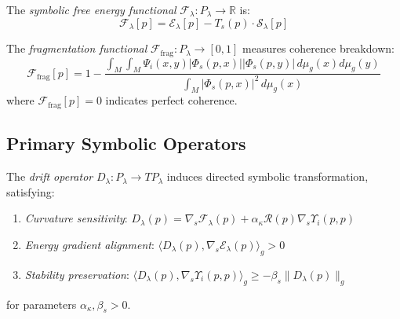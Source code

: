 \begin{definition}
\label{definition:bk6_symbolic_free_energy_functional}
The \emph{symbolic free energy functional} $\mathcal{F}_\lambda : P_\lambda \to \mathbb{R}$ is:
\begin{equation}
\mathcal{F}_\lambda[p] = \mathcal{E}_\lambda[p] - T_s(p) \cdot \mathcal{S}_\lambda[p]
\end{equation}
\end{definition}

\begin{definition}
\label{definition:bk6_fragmentation_functional}
The \emph{fragmentation functional} $\mathcal{F}_{\text{frag}} : P_\lambda \to [0,1]$ measures coherence breakdown:
\begin{equation}
\mathcal{F}_{\text{frag}}[p] = 1 - \frac{\int_M \int_M \Psi_i(x,y)|\Phi_s(p,x)||\Phi_s(p,y)| \, d\mu_g(x) d\mu_g(y)}{\int_M |\Phi_s(p,x)|^2 \, d\mu_g(x)}
\end{equation}
where $\mathcal{F}_{\text{frag}}[p] = 0$ indicates perfect coherence.
\end{definition}

\subsection{Primary Symbolic Operators}
\label{subsection:bk6_primary_symbolic_operators_complete}

\begin{definition}
\label{definition:bk6_drift_operator_complete}
The \emph{drift operator} $D_\lambda : P_{\lambda} \to T P_{\lambda}$ induces directed symbolic transformation, satisfying:
\begin{enumerate}
\item \emph{Curvature sensitivity}: $D_\lambda(p) = \nabla_s\mathcal{F}_{\lambda}(p) + \alpha_\kappa \mathcal{R}(p) \nabla_s \Upsilon_i(p,p)$
\item \emph{Energy gradient alignment}: $\langle D_\lambda(p), \nabla_s \mathcal{E}_\lambda(p) \rangle_g > 0$
\item \emph{Stability preservation}: $\langle D_\lambda(p), \nabla_s \Upsilon_i(p,p) \rangle_g \geq -\beta_s \|D_\lambda(p)\|_g$
\end{enumerate}
for parameters $\alpha_\kappa, \beta_s > 0$.
\end{definition}

